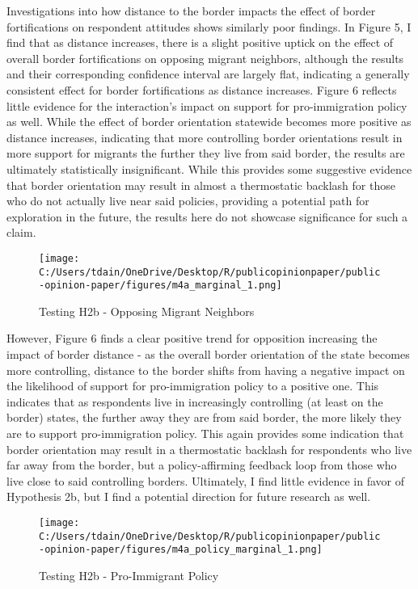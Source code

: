 \documentclass[12pt,]{article}
\begin{document}
Investigations into how distance to the border impacts the effect of
border fortifications on respondent attitudes shows similarly poor
findings. In Figure 5, I find that as distance increases, there is a
slight positive uptick on the effect of overall border fortifications on
opposing migrant neighbors, although the results and their corresponding
confidence interval are largely flat, indicating a generally consistent
effect for border fortifications as distance increases. Figure 6
reflects little evidence for the interaction's impact on support for
pro-immigration policy as well. While the effect of border orientation
statewide becomes more positive as distance increases, indicating that
more controlling border orientations result in more support for migrants
the further they live from said border, the results are ultimately
statistically insignificant. While this provides some suggestive
evidence that border orientation may result in almost a thermostatic
backlash for those who do not actually live near said policies,
providing a potential path for exploration in the future, the results
here do not showcase significance for such a claim.

\begin{figure}
\centering
\texttt{[image: C:/Users/tdain/OneDrive/Desktop/R/publicopinionpaper/public-opinion-paper/figures/m4a\_marginal\_1.png]}
\caption{Testing H2b - Opposing Migrant Neighbors}
\end{figure}

However, Figure 6 finds a clear positive trend for opposition increasing
the impact of border distance - as the overall border orientation of the
state becomes more controlling, distance to the border shifts from
having a negative impact on the likelihood of support for
pro-immigration policy to a positive one. This indicates that as
respondents live in increasingly controlling (at least on the border)
states, the further away they are from said border, the more likely they
are to support pro-immigration policy. This again provides some
indication that border orientation may result in a thermostatic backlash
for respondents who live far away from the border, but a
policy-affirming feedback loop from those who live close to said
controlling borders. Ultimately, I find little evidence in favor of
Hypothesis 2b, but I find a potential direction for future research as
well.

\begin{figure}
\centering
\texttt{[image: C:/Users/tdain/OneDrive/Desktop/R/publicopinionpaper/public-opinion-paper/figures/m4a\_policy\_marginal\_1.png]}
\caption{Testing H2b - Pro-Immigrant Policy}
\end{figure}
\end{document}
